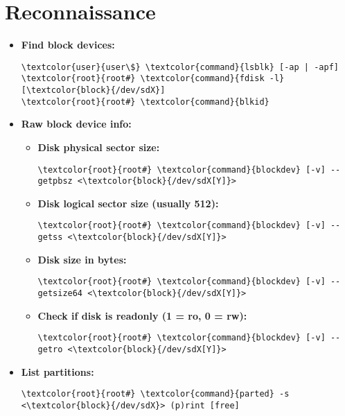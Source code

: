 \documentclass[10pt, a4paper, onecolumn, oneside, titlepage, openany]{book}
\begin{document}
\section{Reconnaissance}
\begin{itemize}
    \item \textbf{Find block devices:}
\begin{Verbatim}[commandchars=\\\{\}]
\textcolor{user}{user\$} \textcolor{command}{lsblk} [-ap | -apf]
\textcolor{root}{root#} \textcolor{command}{fdisk -l} [\textcolor{block}{/dev/sdX}]
\textcolor{root}{root#} \textcolor{command}{blkid}
\end{Verbatim}
\item \textbf{Raw block device info:}
    \begin{itemize}
        \item \textbf{Disk physical sector size:}
\begin{Verbatim}[commandchars=\\\{\}]
\textcolor{root}{root#} \textcolor{command}{blockdev} [-v] --getpbsz <\textcolor{block}{/dev/sdX[Y]}>
\end{Verbatim}
        \item \textbf{Disk logical sector size (usually 512):}
\begin{Verbatim}[commandchars=\\\{\}]
\textcolor{root}{root#} \textcolor{command}{blockdev} [-v] --getss <\textcolor{block}{/dev/sdX[Y]}>
\end{Verbatim}
        \item \textbf{Disk size in bytes:}
\begin{Verbatim}[commandchars=\\\{\}]
\textcolor{root}{root#} \textcolor{command}{blockdev} [-v] --getsize64 <\textcolor{block}{/dev/sdX[Y]}>
\end{Verbatim}
    \item \textbf{Check if disk is readonly (1 = ro, 0 = rw):}
\begin{Verbatim}[commandchars=\\\{\}]
\textcolor{root}{root#} \textcolor{command}{blockdev} [-v] --getro <\textcolor{block}{/dev/sdX[Y]}>
\end{Verbatim}
    \end{itemize}
    \item \textbf{List partitions:}
\begin{Verbatim}[commandchars=\\\{\}]
\textcolor{root}{root#} \textcolor{command}{parted} -s <\textcolor{block}{/dev/sdX}> (p)rint [free]
\end{Verbatim}
\end{itemize}
\end{document}
